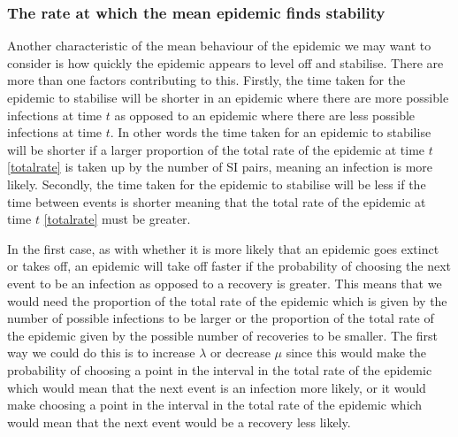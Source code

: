\documentclass{uonmathsreport}
\begin{document}
\subsubsection{The rate at which the mean epidemic finds stability} \label{subsub:5.4.4}

Another characteristic of the mean behaviour of the epidemic we may want to consider is how quickly the epidemic appears to level off and stabilise. There are more than one factors contributing to this. Firstly, the time taken for the epidemic to stabilise will be shorter in an epidemic where there are more possible infections at time $t$ as opposed to an epidemic where there are less possible infections at time $t$. In other words the time taken for an epidemic to stabilise will be shorter if a larger proportion of the total rate of the epidemic at time $t$ \eqref{totalrate} is taken up by the number of SI pairs, meaning an infection is more likely. Secondly, the time taken for the epidemic to stabilise will be less if the time between events is shorter meaning that the total rate of the epidemic at time $t$ \eqref{totalrate} must be greater. 

In the first case, as with whether it is more likely that an epidemic goes extinct or takes off, an epidemic will take off faster if the probability of choosing the next event to be an infection as opposed to a recovery is greater. This means that we would need the proportion of the total rate of the epidemic which is given by the number of possible infections to be larger or the proportion of the total rate of the epidemic given by the possible number of recoveries to be smaller. The first way we could do this is to increase $\lambda$ or decrease $\mu$ since this would make the probability of choosing a point in the interval in the total rate of the epidemic which would mean that the next event is an infection more likely, or it would make choosing a point in the interval in the total rate of the epidemic which would mean that the next event would be a recovery less likely.
\end{document}
